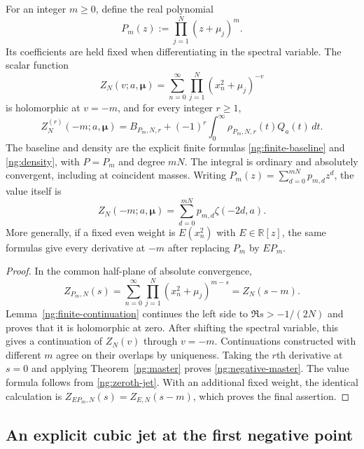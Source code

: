 \begin{corollary}
\label{ng:negative-integers}
For an integer $m\geq0$, define the real polynomial
\begin{equation}
 P_m(z):=\prod_{j=1}^{N}(z+\mu_j)^m.
 \label{ng:negative-weight}
\end{equation}
Its coefficients are held fixed when differentiating in the
spectral variable.  The scalar function
\[
 Z_N(v;a,\boldsymbol\mu)
   =\sum_{n=0}^{\infty}\prod_{j=1}^{N}(x_n^2+\mu_j)^{-v}
\]
is holomorphic at $v=-m$, and for every integer $r\geq1$,
\begin{equation}
 \boxed{\displaystyle
 Z_N^{(r)}(-m;a,\boldsymbol\mu)
 =B_{P_m,N,r}
       +(-1)^r\int_0^{\infty}\rho_{P_m,N,r}(t)Q_a(t)\,dt.}
 \label{ng:negative-master}
\end{equation}
The baseline and density are the explicit finite formulas
\eqref{ng:finite-baseline} and \eqref{ng:density}, with
$P=P_m$ and degree $mN$.  The integral is ordinary and absolutely
convergent, including at coincident masses.
Writing $P_m(z)=\sum_{d=0}^{mN}p_{m,d}z^d$, the value itself is
\begin{equation}
 Z_N(-m;a,\boldsymbol\mu)
       =\sum_{d=0}^{mN}p_{m,d}\zeta(-2d,a).
 \label{ng:negative-value}
\end{equation}
More generally, if a fixed even weight is $E(x_n^2)$ with
$E\in\mathbb R[z]$, the same formulas give every derivative at
$-m$ after replacing $P_m$ by $E P_m$.
\end{corollary}

\begin{proof}
In the common half-plane of absolute convergence,
\[
 Z_{P_m,N}(s)
 =\sum_{n=0}^{\infty}\prod_{j=1}^{N}
                      (x_n^2+\mu_j)^{m-s}
 =Z_N(s-m).
\]
Lemma~\ref{ng:finite-continuation} continues the left side to
$\Re s>-1/(2N)$ and proves that it is holomorphic at zero.
After shifting the spectral variable, this gives a continuation
of $Z_N(v)$ through $v=-m$.  Continuations constructed with
different $m$ agree on their overlaps by uniqueness.
Taking the $r$th derivative at $s=0$ and applying
Theorem~\ref{ng:master} proves \eqref{ng:negative-master}.
The value formula follows from \eqref{ng:zeroth-jet}.
With an additional fixed weight, the identical calculation is
$Z_{E P_m,N}(s)=Z_{E,N}(s-m)$, which proves the final assertion.
\end{proof}

\subsection{An explicit cubic jet at the first negative point}
\label{ng:cubic-example-subsection}


